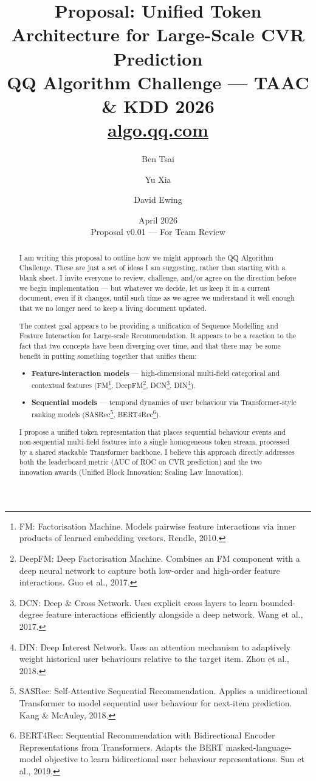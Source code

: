 \documentclass[10pt]{article}
\title{Proposal: Unified Token Architecture for Large-Scale CVR Prediction\\
\large QQ Algorithm Challenge --- TAAC \& KDD 2026\\
\normalsize \href{https://algo.qq.com/\#intro}{algo.qq.com}}
\author{Ben Tsai \and Yu Xia \and David Ewing}
\date{April 2026 \\ \small Proposal v0.01 --- For Team Review}
\begin{document}
\maketitle

\begin{abstract}
I am writing this proposal to outline how we might approach the QQ
Algorithm Challenge. These are just a set of ideas I am suggesting,
rather than starting with a blank sheet. I invite everyone to review,
challenge, and/or agree on the direction before we begin
implementation --- but whatever we decide, let us keep it in a current
document, even if it changes, until such time as we agree we understand
it well enough that we no longer need to keep a living document updated.

The contest goal appears to be providing a unification of Sequence
Modelling and Feature Interaction for Large-scale Recommendation. It
appears to be a reaction to the fact that two concepts have been
diverging over time, and that there may be some benefit in putting
something together that unifies them:
\begin{itemize}
    \item \textbf{Feature-interaction models} --- high-dimensional
          multi-field categorical and contextual features
          (FM\footnote{FM: Factorisation Machine. Models pairwise
          feature interactions via inner products of learned embedding
          vectors. Rendle, 2010.},
          DeepFM\footnote{DeepFM: Deep Factorisation Machine. Combines
          an FM component with a deep neural network to capture both
          low-order and high-order feature interactions. Guo et al.,
          2017.},
          DCN\footnote{DCN: Deep \& Cross Network. Uses explicit cross
          layers to learn bounded-degree feature interactions efficiently
          alongside a deep network. Wang et al., 2017.},
          DIN\footnote{DIN: Deep Interest Network. Uses an attention
          mechanism to adaptively weight historical user behaviours
          relative to the target item. Zhou et al., 2018.}).
    \item \textbf{Sequential models} --- temporal dynamics of user
          behaviour via Transformer-style ranking models
          (SASRec\footnote{SASRec: Self-Attentive Sequential
          Recommendation. Applies a unidirectional Transformer to model
          sequential user behaviour for next-item prediction. Kang \&
          McAuley, 2018.},
          BERT4Rec\footnote{BERT4Rec: Sequential Recommendation with
          Bidirectional Encoder Representations from Transformers.
          Adapts the BERT masked-language-model objective to learn
          bidirectional user behaviour representations. Sun et al.,
          2019.}).
\end{itemize}
I propose a unified token representation that places sequential
behaviour events and non-sequential multi-field features into a single
homogeneous token stream, processed by a shared stackable Transformer
backbone. I believe this approach directly addresses both the
leaderboard metric (AUC of ROC on CVR prediction) and the two
innovation awards (Unified Block Innovation; Scaling Law Innovation).
\end{abstract}
\end{document}
